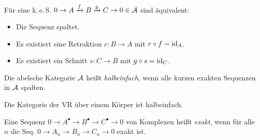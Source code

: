 \documentclass{cheat-sheet}
\newenvironment{centertikzcd}
  {\begin{center}\begin{tikzcd}}
  {\end{tikzcd}\end{center}}
\newcommand{\CCC}[1]{{#1}^{\bullet}} %
\newcommand{\keS}{k.\,e.\,S.} %
\newcommand{\leS}{l.\,e.\,S.} %
\DeclareMathOperator{\coker}{coker} %
\begin{document}
\begin{prop}
  Für eine \keS{} $0 \to A \xrightarrow{f} B \xrightarrow{g} C \to 0 \in \mathcal{A}$ sind äquivalent:
  \begin{itemize}
    \item Die Sequenz spaltet.
    \item Es existiert eine Retraktion $r : B \to A$ mit $r \circ f = \operatorname{id}_A$.
    \item Es existiert ein Schnitt $s : C \to B$ mit $g \circ s = \operatorname{id}_C$.
  \end{itemize}
\end{prop}

\begin{defn}
  Die abelsche Kategorie $\mathcal{A}$ heißt \emph{halbeinfach}, wenn alle kurzen exakten Sequenzen in $\mathcal{A}$ spalten.
\end{defn}

\begin{bsp}
  Die Kategorie der VR über einem Körper ist halbeinfach.
\end{bsp}


\begin{defn}
  Eine Sequenz $0 \to \CCC{A} \to \CCC{B} \to \CCC{C} \to 0$ von Komplexen heißt \emph{exakt}, wenn für alle $n$ die Seq. $0 \to A_n \to B_n \to C_n \to 0$ exakt ist.
\end{defn}
\end{document}
